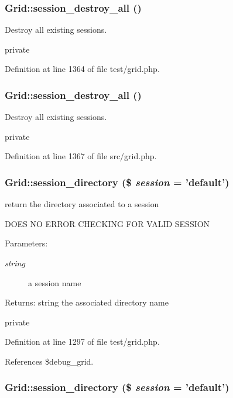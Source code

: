 \subsubsection{\setlength{\rightskip}{0pt plus 5cm}Grid::session\_\-destroy\_\-all ()}\label{classGrid_a45}


Destroy all existing sessions. 

private 

Definition at line 1364 of file test/grid.php.
\subsubsection{\setlength{\rightskip}{0pt plus 5cm}Grid::session\_\-destroy\_\-all ()}\label{classGrid_a19}


Destroy all existing sessions. 

private 

Definition at line 1367 of file src/grid.php.
\subsubsection{\setlength{\rightskip}{0pt plus 5cm}Grid::session\_\-directory (\$ {\em session} = 'default')}\label{classGrid_a42}


return the directory associated to a session 

DOES NO ERROR CHECKING FOR VALID SESSION

\begin{Desc}
\item[Parameters:]
\begin{description}
\item[{\em string}]a session name \end{description}
\end{Desc}
\begin{Desc}
\item[Returns:]string the associated directory name\end{Desc}
private 

Definition at line 1297 of file test/grid.php.

References \$debug\_\-grid.
\subsubsection{\setlength{\rightskip}{0pt plus 5cm}Grid::session\_\-directory (\$ {\em session} = 'default')}\label{classGrid_a16}


